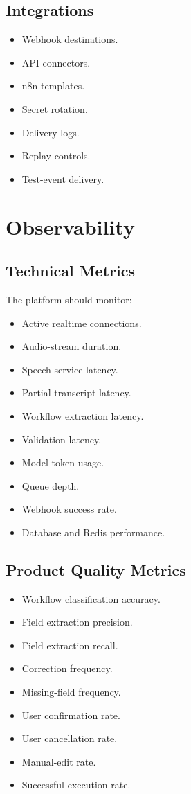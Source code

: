 \documentclass[11pt,a4paper]{article}
\begin{document}
\subsection{Integrations}

\begin{itemize}
\item Webhook destinations.
\item API connectors.
\item n8n templates.
\item Secret rotation.
\item Delivery logs.
\item Replay controls.
\item Test-event delivery.
\end{itemize}

\section{Observability}

\subsection{Technical Metrics}

The platform should monitor:

\begin{itemize}
\item Active realtime connections.
\item Audio-stream duration.
\item Speech-service latency.
\item Partial transcript latency.
\item Workflow extraction latency.
\item Validation latency.
\item Model token usage.
\item Queue depth.
\item Webhook success rate.
\item Database and Redis performance.
\end{itemize}

\subsection{Product Quality Metrics}

\begin{itemize}
\item Workflow classification accuracy.
\item Field extraction precision.
\item Field extraction recall.
\item Correction frequency.
\item Missing-field frequency.
\item User confirmation rate.
\item User cancellation rate.
\item Manual-edit rate.
\item Successful execution rate.
\end{itemize}
\end{document}
